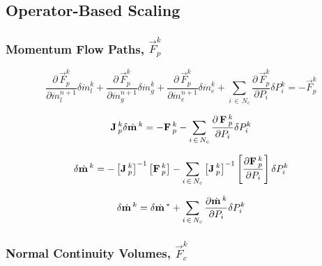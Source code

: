 \documentclass[compress,xcolor=table]{beamer}
\begin{document}
\subsection[Operator-Based Scaling]{Operator-Based Scaling}
\begin{frame}
\frametitle{Momentum Flow Paths, $\vec{F}^{k}_{p}$}
\begin{equation*}
\frac{\partial\, \vec{F}^{k}_{p}}{\partial \dot{m}^{n+1}_{l}} \delta \dot{m}_{l}^{k} + \frac{\partial\, \vec{F}^{k}_{p}}{\partial \dot{m}^{n+1}_{g}} \delta \dot{m}_{g}^{k} + \frac{\partial\, \vec{F}^{k}_{p}}{\partial \dot{m}^{n+1}_{e}} \delta \dot{m}_{e}^{k} + \sum_{i\, \in \, N_{c}} \frac{\partial\, \vec{F}^{k}_{p}}{\partial P_{i}} \delta P_{i}^{k} = - \vec{F}^{k}_{p}
\end{equation*}

\begin{equation*}
\vec{J}^{k}_{p} \delta \momVec{}^{k}  = - \vec{F}^{k}_{p} - \sum_{i\, \in \, N_{c}} \frac{\partial\, \vec{F}^{k}_{p}}{\partial P_{i}} \delta P_{i}^{k}
\end{equation*}

\begin{equation*}
\delta \momVec{}^{k} = - \left[\vec{J}_{p}^{k}\right]^{-1} \left[\vec{F}^{k}_{p} \right] - \sum_{i \, \in \, N_{c} } \left[\vec{J}^{k}_{p}\right]^{-1} \left[\frac{\partial \vec{F}^{k}_{p}}{\partial P_{i}}\right] \delta P^{k}_{i}
\end{equation*}

\begin{equation*}
\delta \momVec{}^{k} = \delta \momVec{}^{*} + \sum_{i \, \in \, N_{c} } \frac{\partial \momVec{}^{k}}{\partial P_{i}} \delta P^{k}_{i}
\end{equation*}

\end{frame}
\begin{frame}
\frametitle{Normal Continuity Volumes, $\vec{F}^{k}_{c}$}


\end{frame}
\end{document}
